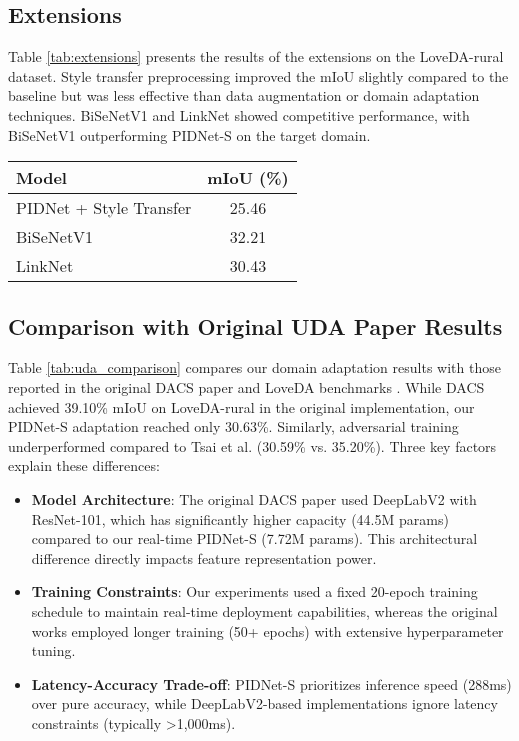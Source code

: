 \documentclass{article}
\begin{document}
\begin{multicols}{2}
		
		\subsection{Extensions}
		\justifying
		Table \ref{tab:extensions} presents the results of the extensions on the LoveDA-rural dataset. Style transfer preprocessing improved the mIoU slightly compared to the baseline but was less effective than data augmentation or domain adaptation techniques. BiSeNetV1 and LinkNet showed competitive performance, with BiSeNetV1 outperforming PIDNet-S on the target domain.
		

			\centering
			\label{tab:extensions}
			\begin{tabular}{|l|c|}
				\hline
				Model & mIoU (\%) \\ \hline
				PIDNet + Style Transfer & 25.46 \\ \hline
				BiSeNetV1 & 32.21 \\ \hline
				LinkNet & 30.43 \\ \hline
			\end{tabular}

		\subsection{Comparison with Original UDA Paper Results}
		Table \ref{tab:uda_comparison} compares our domain adaptation results with those reported in the original DACS paper \cite{tranheden2021dacs} and LoveDA benchmarks \cite{loveda2021}. While DACS achieved 39.10\% mIoU on LoveDA-rural in the original implementation, our PIDNet-S adaptation reached only 30.63\%. Similarly, adversarial training underperformed compared to Tsai et al. \cite{tsai2018learning} (30.59\% vs. 35.20\%). Three key factors explain these differences:
		
		\begin{itemize}
			\item \textbf{Model Architecture}: The original DACS paper used DeepLabV2 with ResNet-101, which has significantly higher capacity (44.5M params) compared to our real-time PIDNet-S (7.72M params). This architectural difference directly impacts feature representation power.
			\item \textbf{Training Constraints}: Our experiments used a fixed 20-epoch training schedule to maintain real-time deployment capabilities, whereas the original works employed longer training (50+ epochs) with extensive hyperparameter tuning.
			\item \textbf{Latency-Accuracy Trade-off}: PIDNet-S prioritizes inference speed (288ms) over pure accuracy, while DeepLabV2-based implementations ignore latency constraints (typically >1,000ms).
		\end{itemize}
		

\end{multicols}
\end{document}
